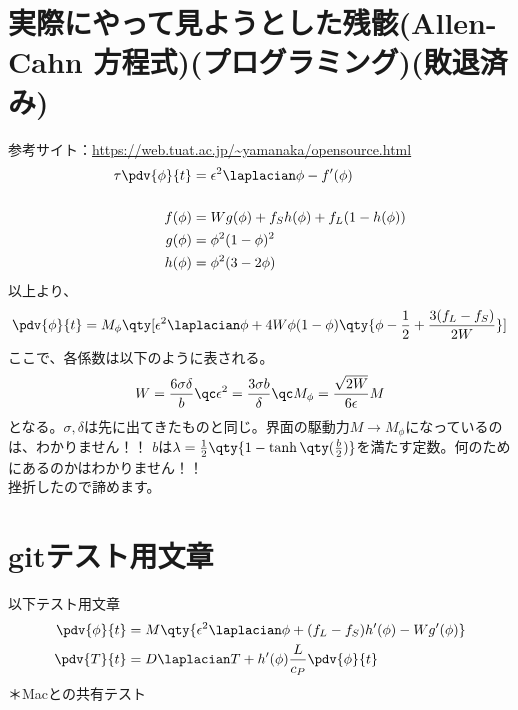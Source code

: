 \documentclass[twocolumn,landscape]{ltjsarticle}
\begin{document}
\section{実際にやって見ようとした残骸(Allen-Cahn 方程式)(プログラミング)(敗退済み)}
参考サイト：\url{https://web.tuat.ac.jp/~yamanaka/opensource.html}
\begin{equation}
  \begin{split}
    \tau\pdv{\phi}{t} & =\epsilon^2\laplacian\phi-f'(\phi)    \\
    \\
    f(\phi)           & =W g(\phi)+f_S h(\phi)+f_L(1-h(\phi)) \\
    g(\phi)           & =\phi^2(1-\phi)^2                     \\
    h(\phi)           & =\phi^2(3-2\phi)
  \end{split}
\end{equation}
以上より、
\begin{equation}
  \pdv{\phi}{t}=M_\phi\qty[\epsilon^2\laplacian\phi+4W\phi(1-\phi)\qty{\phi-\frac{1}{2}+\frac{3(f_L-f_S)}{2W}}]
\end{equation}
ここで、各係数は以下のように表される。
\begin{equation}
  W=\frac{6\sigma\delta}{b}\qc\epsilon^2=\frac{3\sigma b}{\delta}\qc M_\phi=\frac{\sqrt{2W}}{6\epsilon}M
\end{equation}
となる。$\sigma,\delta$は先に出てきたものと同じ。界面の駆動力$M\rightarrow M_\phi$になっているのは、\color{red}わかりません！！\color{black}
$b$は$\lambda=\frac{1}{2}\qty{1-\tanh\qty(\frac{b}{2})}$を満たす定数。\color{red}何のためにあるのかはわかりません！！\color{black}\\
挫折したので諦めます。

\section{gitテスト用文章}
以下テスト用文章
\begin{equation}
  \begin{split}
    \pdv{\phi}{t} & =M\qty{\epsilon^2\laplacian\phi+(f_L-f_S)h'(\phi)-Wg'(\phi)} \\
    \pdv{T}{t}    & =D\laplacian T+h'(\phi)\frac{L}{c_P}\pdv{\phi}{t}
  \end{split}
\end{equation}
＊Macとの共有テスト
\end{document}
